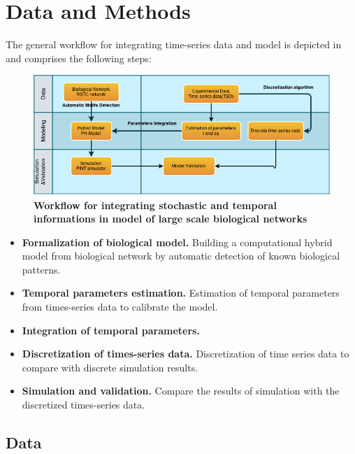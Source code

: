 
\section{Data and Methods}


The general workflow for integrating time-series data and model is depicted in  and comprises the following steps:

\begin{figure}[!t]
 \centering
 \includegraphics[width=6.5in]{images/workflow-2.png}
\caption{{\bf Workflow for integrating stochastic and temporal informations in model of large scale biological networks}} 
 \label{fig:workflow}
\end{figure}

\begin{itemize}
 \item \textbf{Formalization of biological model.} Building a computational hybrid model  from biological network by automatic detection of known biological patterns.
 \item \textbf{Temporal parameters estimation.} Estimation of temporal parameters from times-series data to calibrate the model.
 \item \textbf{Integration of temporal parameters.} 
 \item \textbf{Discretization of times-series data.} Discretization of time series data to compare with discrete simulation results.
 \item \textbf{Simulation and validation.} Compare the results of simulation with the discretized times-series data.
\end{itemize}

\subsection{Data}

